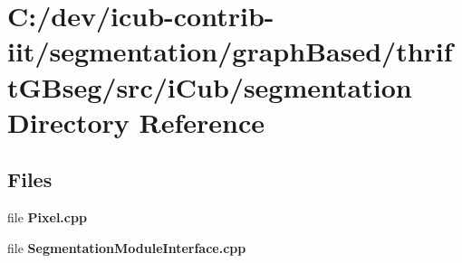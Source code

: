 \section{C\+:/dev/icub-\/contrib-\/iit/segmentation/graph\+Based/thrift\+G\+Bseg/src/i\+Cub/segmentation Directory Reference}
\label{dir_496ea1ba30e91b64f5187ecd0adbcbfd}
\subsection*{Files}
\begin{DoxyCompactItemize}
\item 
file {\bfseries Pixel.\+cpp}
\item 
file {\bfseries Segmentation\+Module\+Interface.\+cpp}
\end{DoxyCompactItemize}
